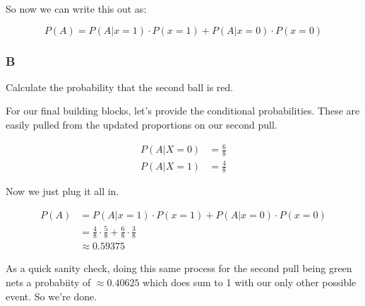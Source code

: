 So now we can write this out as:

\[P(A) = P(A | x=1) \cdot P(x=1) + P(A | x=0) \cdot P(x=0)\]

\subsubsection*{B}

Calculate the probability that the second ball is red.

For our final building blocks, let's provide the conditional probabilities. These are easily pulled from the updated proportions on our second pull.

\begin{align*}
	P(A | X=0) &= \frac{6}{8} \\
	P(A | X=1) &= \frac{4}{8}
\end{align*}

Now we just plug it all in.

\begin{align*}
	P(A) &= P(A | x=1) \cdot P(x=1) + P(A | x=0) \cdot P(x=0) \\
	&= \frac{4}{8} \cdot \frac{5}{8} + \frac{6}{8} \cdot \frac{3}{8} \\
	&\approx 0.59375
\end{align*}

As a quick sanity check, doing this same process for the second pull being green nets a probabiity of $\approx 0.40625$ which does sum to 1 with our only other possible event. So we're done.
